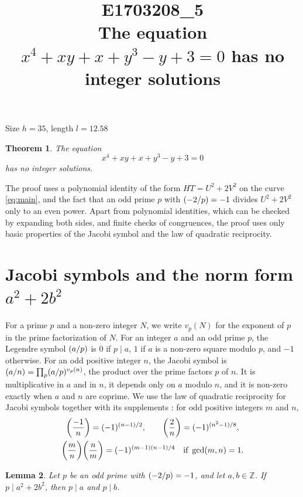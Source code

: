 \documentclass[11pt]{article}
\title{\textbf{E1703208\_5}\\[4pt] {\Large The equation $x^{4}+xy+x+y^{3}-y+3=0$ has no integer solutions}}
\author{}
\date{}
\newtheorem{theorem}{Theorem}
\newtheorem{lemma}[theorem]{Lemma}
\newcommand{\Z}{\mathbb{Z}}
\newcommand{\leg}[2]{\mathchoice{\biggl(\dfrac{#1}{#2}\biggr)}{(#1/#2)}{(#1/#2)}{(#1/#2)}}
\begin{document}
\maketitle
\vspace{-8ex}
\begin{center}
Size $h=35$, length $l=12.58$
\end{center}

\begin{theorem}\label{thm:main}
The equation
\begin{equation}\label{eq:main}
x^{4}+xy+x+y^{3}-y+3=0
\end{equation}
has no integer solutions.
\end{theorem}

The proof uses a polynomial identity of the form $HT=U^2+2V^2$ on the curve \eqref{eq:main}, and the fact that an odd prime $p$ with $\leg{-2}{p}=-1$ divides $U^2+2V^2$ only to an even power. Apart from polynomial identities, which can be checked by expanding both sides, and finite checks of congruences, the proof uses only basic properties of the Jacobi symbol and the law of quadratic reciprocity.

\section{\texorpdfstring{Jacobi symbols and the norm form $a^2+2b^2$}{Jacobi symbols and the norm form}}

For a prime $p$ and a non-zero integer $N$, we write $v_p(N)$ for the exponent of $p$ in the prime factorization of $N$. For an integer $a$ and an odd prime $p$, the Legendre symbol $\leg{a}{p}$ is $0$ if $p\mid a$, $1$ if $a$ is a non-zero square modulo $p$, and $-1$ otherwise. For an odd positive integer $n$, the Jacobi symbol is $\leg{a}{n}=\prod_p\leg{a}{p}^{v_p(n)}$, the product over the prime factors $p$ of $n$. It is multiplicative in $a$ and in $n$, it depends only on $a$ modulo $n$, and it is non-zero exactly when $a$ and $n$ are coprime. We use the law of quadratic reciprocity for Jacobi symbols together with its supplements \cite[Chapter~5, \S2]{IR}: for odd positive integers $m$ and $n$,
\begin{gather*}
\leg{-1}{n}=(-1)^{(n-1)/2},\qquad\leg{2}{n}=(-1)^{(n^2-1)/8},\\
\leg{m}{n}\leg{n}{m}=(-1)^{(m-1)(n-1)/4}\quad\text{if }\gcd(m,n)=1.
\end{gather*}

\begin{lemma}\label{lem:divides}
Let $p$ be an odd prime with $\leg{-2}{p}=-1$, and let $a,b\in\Z$. If $p\mid a^2+2b^2$, then $p\mid a$ and $p\mid b$.
\end{lemma}
\end{document}
